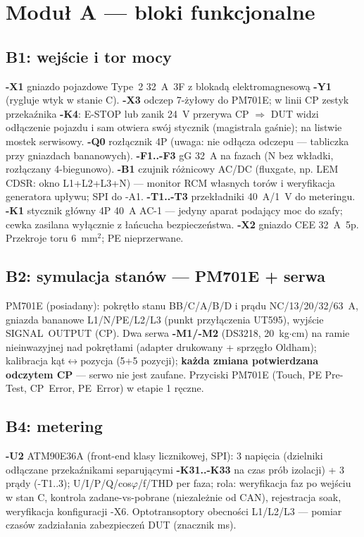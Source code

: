 \documentclass[11pt,a4paper]{article}
\begin{document}
\section{Moduł A --- bloki funkcjonalne}
\subsection{B1: wejście i tor mocy}
\textbf{-X1} gniazdo pojazdowe Type~2 32~A~3F z blokadą elektromagnesową \textbf{-Y1} (rygluje
wtyk w stanie C). \textbf{-X3} odczep 7-żyłowy do PM701E; w linii CP zestyk przekaźnika
\textbf{-K4}: E-STOP lub zanik 24~V przerywa CP $\Rightarrow$ DUT widzi odłączenie pojazdu i sam
otwiera swój stycznik (magistrala gaśnie); na listwie mostek serwisowy. \textbf{-Q0} rozłącznik
4P (uwaga: nie odłącza odczepu --- tabliczka przy gniazdach bananowych). \textbf{-F1..-F3} gG
32~A na fazach (N bez wkładki, rozłączany 4-biegunowo). \textbf{-B1} czujnik różnicowy AC/DC
(fluxgate, np. LEM CDSR: okno L1+L2+L3+N) --- monitor RCM własnych torów i weryfikacja generatora
upływu; SPI do -A1. \textbf{-T1..-T3} przekładniki 40~A/1~V do meteringu. \textbf{-K1} stycznik
główny 4P 40~A AC-1 --- jedyny aparat podający moc do szafy; cewka zasilana wyłącznie z łańcucha
bezpieczeństwa. \textbf{-X2} gniazdo CEE 32~A~5p. Przekroje toru 6~mm$^2$; PE nieprzerwane.
\subsection{B2: symulacja stanów --- PM701E + serwa}
PM701E (posiadany): pokrętło stanu BB/C/A/B/D i prądu NC/13/20/32/63~A, gniazda bananowe
L1/N/PE/L2/L3 (punkt przyłączenia UT595), wyjście SIGNAL~OUTPUT (CP). Dwa serwa \textbf{-M1/-M2}
(DS3218, 20~kg$\cdot$cm) na ramie nieinwazyjnej nad pokrętłami (adapter drukowany + sprzęgło
Oldham); kalibracja kąt$\leftrightarrow$pozycja (5+5 pozycji); \textbf{każda zmiana potwierdzana
odczytem CP} --- serwo nie jest zaufane. Przyciski PM701E (Touch, PE Pre-Test, CP~Error, PE~Error)
w etapie 1 ręczne.
\subsection{B4: metering}
\textbf{-U2} ATM90E36A (front-end klasy licznikowej, SPI): 3 napięcia (dzielniki odłączane
przekaźnikami separującymi \textbf{-K31..-K33} na czas prób izolacji) + 3 prądy (-T1..3);
U/I/P/Q/cos$\varphi$/f/THD per faza; rola: weryfikacja faz po wejściu w stan C, kontrola
zadane-vs-pobrane (niezależnie od CAN), rejestracja soak, weryfikacja konfiguracji -X6.
Optotransoptory obecności L1/L2/L3 --- pomiar czasów zadziałania zabezpieczeń DUT (znacznik ms).
\end{document}
